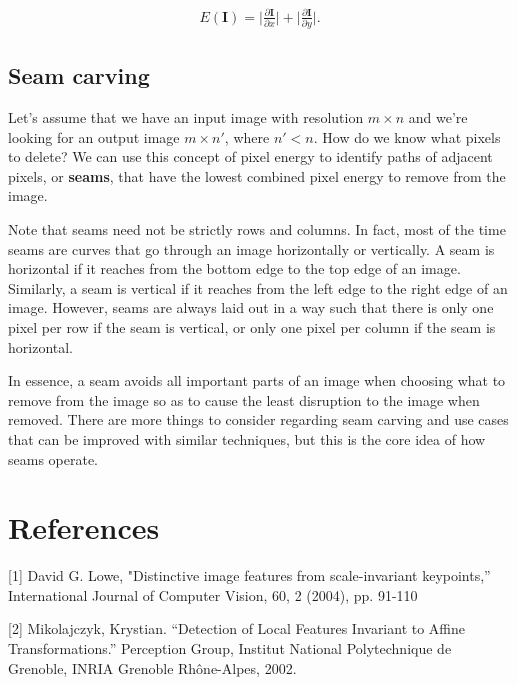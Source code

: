 \documentclass{article}
\begin{document}
\begin{align}
	E(\textbf{I}) = \bigg| \frac{\partial \textbf{I}}{\partial x} \bigg| + \bigg| \frac{\partial \textbf{I}}{\partial y} \bigg| \text{.} \nonumber
\end{align}

\subsection{Seam carving}

Let's assume that we have an input image with resolution $m \times n$ and we're looking for an output image $m \times n'$, where $n' < n$. How do we know what pixels to delete? We can use this concept of pixel energy to identify paths of adjacent pixels, or \textbf{seams}, that have the lowest combined pixel energy to remove from the image.

Note that seams need not be strictly rows and columns. In fact, most of the time seams are curves that go through an image horizontally or vertically. A seam is horizontal if it reaches from the bottom edge to the top edge of an image. Similarly, a seam is vertical if it reaches from the left edge to the right edge of an image. However, seams are always laid out in a way such that there is only one pixel per row if the seam is vertical, or only one pixel per column if the seam is horizontal.

In essence, a seam avoids all important parts of an image when choosing what to remove from the image so as to cause the least disruption to the image when removed. There are more things to consider regarding seam carving and use cases that can be improved with similar techniques, but this is the core idea of how seams operate.

\section*{References}
[1] David G. Lowe, "Distinctive image features from scale-invariant keypoints,”  International Journal of Computer Vision, 60, 2 (2004), pp. 91-110

[2] Mikolajczyk, Krystian. “Detection of Local Features Invariant to Affine Transformations.” Perception Group, Institut National Polytechnique de Grenoble, INRIA Grenoble Rhône-Alpes, 2002.


% 
% 
\end{document}
